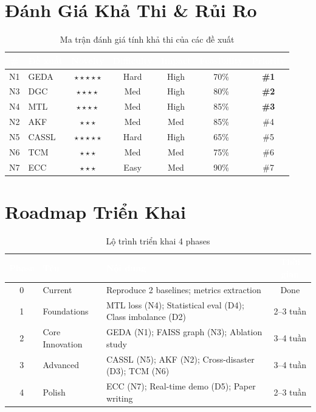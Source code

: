 \documentclass[12pt,a4paper]{article}
\begin{document}
\section{Đánh Giá Khả Thi \& Rủi Ro}

\begin{table}[H]
\centering
\caption{Ma trận đánh giá tính khả thi của các đề xuất}
\label{tab:feasibility}
\begin{tabular}{clccccc}
\toprule
\rowcolor{tableheader}
\textcolor{white}{\#} & \textcolor{white}{\textbf{Đề xuất}} & \textcolor{white}{\textbf{Novelty}} & \textcolor{white}{\textbf{Difficulty}} & \textcolor{white}{\textbf{Impact}} & \textcolor{white}{\textbf{Feasibility}} & \textcolor{white}{\textbf{Priority}} \\
\midrule
N1 & GEDA & $\star\star\star\star\star$ & Hard & High & 70\% & \textbf{\#1} \\
N3 & DGC & $\star\star\star\star$ & Med & High & 80\% & \textbf{\#2} \\
N4 & MTL & $\star\star\star\star$ & Med & High & 85\% & \textbf{\#3} \\
N2 & AKF & $\star\star\star$ & Med & Med & 85\% & \#4 \\
N5 & CASSL & $\star\star\star\star\star$ & Hard & High & 65\% & \#5 \\
N6 & TCM & $\star\star\star$ & Med & Med & 75\% & \#6 \\
N7 & ECC & $\star\star\star$ & Easy & Med & 90\% & \#7 \\
\bottomrule
\end{tabular}
\end{table}

\section{Roadmap Triển Khai}

\begin{table}[H]
\centering
\caption{Lộ trình triển khai 4 phases}
\begin{tabularx}{\textwidth}{c l X c}
\toprule
\rowcolor{tableheader}
\textcolor{white}{\textbf{Phase}} & \textcolor{white}{\textbf{Tên}} & \textcolor{white}{\textbf{Nội dung}} & \textcolor{white}{\textbf{Thời gian}} \\
\midrule
0 & Current & Reproduce 2 baselines; metrics extraction & \textcolor{success}{Done} \\
1 & Foundations & MTL loss (N4); Statistical eval (D4); Class imbalance (D2) & 2--3 tuần \\
2 & Core Innovation & GEDA (N1); FAISS graph (N3); Ablation study & 3--4 tuần \\
3 & Advanced & CASSL (N5); AKF (N2); Cross-disaster (D3); TCM (N6) & 3--4 tuần \\
4 & Polish & ECC (N7); Real-time demo (D5); Paper writing & 2--3 tuần \\
\bottomrule
\end{tabularx}
\end{table}
\end{document}
